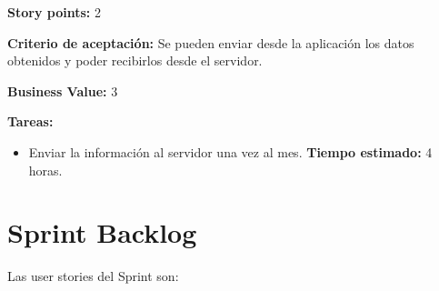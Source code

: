 \begin{enumerate}
\textbf{Story points:} 2

\textbf{Criterio de aceptación:}
Se pueden enviar desde la aplicación los datos obtenidos y poder recibirlos desde el servidor.

\textbf{Business Value:} 3

\textbf{Tareas:}
	\begin{itemize}
		\item Enviar la información al servidor una vez al mes.
		\newline \textbf{Tiempo estimado:} 4 horas. 
	\end{itemize}




\end{enumerate}

\section{Sprint Backlog}

Las user stories del Sprint son:

